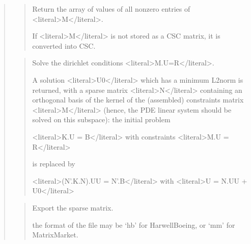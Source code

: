 \documentclass[a4paper,11pt,english]{sphinxmanual}
\begin{document}
\begin{quote}
\begin{quote}
\sphinxAtStartPar
Return the array of values of all non\sphinxhyphen{}zero entries of \textless{}literal\textgreater{}M\textless{}/literal\textgreater{}.

\sphinxAtStartPar
If \textless{}literal\textgreater{}M\textless{}/literal\textgreater{} is not stored as a CSC matrix, it is converted into CSC.
\end{quote}

\sphinxAtStartPar
{}
\begin{quote}

\sphinxAtStartPar
Solve the dirichlet conditions \textless{}literal\textgreater{}M.U=R\textless{}/literal\textgreater{}.

\sphinxAtStartPar
A solution \textless{}literal\textgreater{}U0\textless{}/literal\textgreater{} which has a minimum L2\sphinxhyphen{}norm is returned, with a
sparse matrix \textless{}literal\textgreater{}N\textless{}/literal\textgreater{} containing an orthogonal basis of the kernel of
the (assembled) constraints matrix \textless{}literal\textgreater{}M\textless{}/literal\textgreater{} (hence, the PDE linear system
should be solved on this subspace): the initial problem

\sphinxAtStartPar
\textless{}literal\textgreater{}K.U = B\textless{}/literal\textgreater{} with constraints \textless{}literal\textgreater{}M.U = R\textless{}/literal\textgreater{}

\sphinxAtStartPar
is replaced by

\sphinxAtStartPar
\textless{}literal\textgreater{}(N’.K.N).UU = N’.B\textless{}/literal\textgreater{} with \textless{}literal\textgreater{}U = N.UU + U0\textless{}/literal\textgreater{}
\end{quote}

\sphinxAtStartPar
{}
\begin{quote}

\sphinxAtStartPar
Export the sparse matrix.

\sphinxAtStartPar
the format of the file may be ‘hb’ for Harwell\sphinxhyphen{}Boeing, or ‘mm’
for Matrix\sphinxhyphen{}Market.
\end{quote}

\sphinxAtStartPar
{}
\begin{quote}


\end{quote}
\end{quote}
\end{document}
